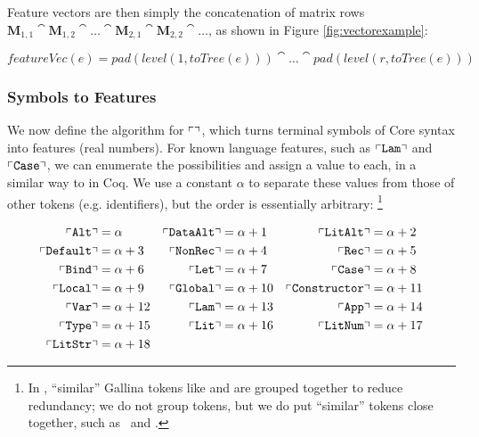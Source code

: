 \begin{sloppypar}
Feature vectors are then simply the concatenation of matrix rows $\mathbf{M}_{1,1} \cat \mathbf{M}_{1,2} \cat \dots \cat \mathbf{M}_{2,1} \cat \mathbf{M}_{2,2} \cat \dots$, as shown in Figure \ref{fig:vectorexample}:
\end{sloppypar}

\begin{equation}
  featureVec(e) = pad(level(1, toTree(e))) \cat \dots \cat pad(level(r, toTree(e)))
\end{equation}

\subsubsection{Symbols to Features}

\iffalse TODO: quine quotes look so much like ceiling. Maybe find a name for it and define it formally in an environment? \fi

We now define the algorithm for $\left\ulcorner  \right\urcorner$, which turns terminal symbols of Core syntax into features (real numbers). For known language features, such as $\left\ulcorner \texttt{Lam} \right\urcorner$ and $\left\ulcorner \texttt{Case} \right\urcorner$, we can enumerate the possibilities and assign a value to each, in a similar way to \citep{DBLP:journals/corr/HerasK14} in Coq. We use a constant $\alpha$ to separate these values from those of other tokens (e.g. identifiers), but the order is essentially arbitrary: \footnote{In \citep{DBLP:journals/corr/HerasK14}, ``similar'' Gallina tokens like  and  are grouped together to reduce redundancy; we do not group tokens, but we do put ``similar'' tokens close together, such as \CLocal\ and \CGlobal.}

\begin{align*}
  \left\ulcorner \texttt{Alt} \right\urcorner          &= \alpha      &
  \left\ulcorner \texttt{DataAlt} \right\urcorner      &= \alpha + 1  &
  \left\ulcorner \texttt{LitAlt} \right\urcorner       &= \alpha + 2  \\
  \left\ulcorner \texttt{Default} \right\urcorner      &= \alpha + 3  &
  \left\ulcorner \texttt{NonRec} \right\urcorner       &= \alpha + 4  &
  \left\ulcorner \texttt{Rec} \right\urcorner          &= \alpha + 5  \\
  \left\ulcorner \texttt{Bind} \right\urcorner         &= \alpha + 6  &
  \left\ulcorner \texttt{Let} \right\urcorner          &= \alpha + 7  &
  \left\ulcorner \texttt{Case} \right\urcorner         &= \alpha + 8  \\
  \left\ulcorner \texttt{Local} \right\urcorner        &= \alpha + 9  &
  \left\ulcorner \texttt{Global} \right\urcorner       &= \alpha + 10 &
  \left\ulcorner \texttt{Constructor} \right\urcorner  &= \alpha + 11 \\
  \left\ulcorner \texttt{Var} \right\urcorner          &= \alpha + 12 &
  \left\ulcorner \texttt{Lam} \right\urcorner          &= \alpha + 13 &
  \left\ulcorner \texttt{App} \right\urcorner          &= \alpha + 14 \\
  \left\ulcorner \texttt{Type} \right\urcorner         &= \alpha + 15 &
  \left\ulcorner \texttt{Lit} \right\urcorner          &= \alpha + 16 &
  \left\ulcorner \texttt{LitNum} \right\urcorner       &= \alpha + 17 \\
  \left\ulcorner \texttt{LitStr} \right\urcorner       &= \alpha + 18
\end{align*}

